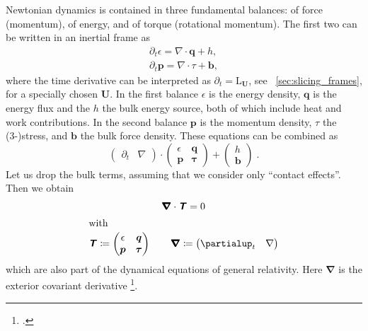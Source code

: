 \documentclass[\ifafour a4paper,12pt,\else a5paper,10pt,\fi%
onecolumn,oneside,article,%
british%
]{memoir}
\theoremstyle{remark}
\theoremstyle{innote}
\newcommand*{\mathte}[1]{\textbf{\textit{\textsf{#1}}}}
\newcommand*{\citep}{\footcites}
\newcommand*{\de}{\partialup}%
\newcommand*{\defd}{\coloneqq}
\renewcommand*{\|}[1][]{\nonscript\,#1\vert\nonscript\;\mathopen{}}
\newcommand*{\sect}{\S}%
\newcommand*{\puzzle}{{\fontencoding{U}\fontfamily{fontawesometwo}\selectfont\symbol{225}}}
\newcommand*{\psect}{{\footnotesize\puzzle}}%
\newcommand*{\Li}{\mathrm{L}}
\newcommand*{\yQ}{h}
\newcommand*{\yqq}{q}
\newcommand*{\yq}{\bm{\yqq}}
\newcommand*{\yTT}{\tau}
\newcommand*{\yT}{\bm{\yTT}}
\newcommand*{\yTTf}{T}
\newcommand*{\yTf}{\mathte{\yTTf}}
\newcommand*{\ybbf}{b}
\newcommand*{\ybf}{\bm{\ybbf}}
\newcommand*{\yFF}{U}
\newcommand*{\yF}{\bm{\yFF}}
\newcommand*{\ypp}{p}
\newcommand*{\yp}{\bm{\ypp}}
\newcommand*{\ye}{\epsilon}
\newcommand*{\ynab}{\nabla}
\newcommand*{\yDi}{\pmb{\bm{\nabla}}}
\begin{document}
Newtonian dynamics is contained in three fundamental balances: of force
(momentum), of energy, and of torque (rotational momentum). The first two
can be written in an inertial frame as
\begin{gather}
  \label{eq:energy_balance_newtonian}
  \de_t \ye = \ynab\cdot\yq + \yQ,
  \\
  \de_t\yp = \ynab\cdot\yTT + \ybf,
\end{gather}
where the time derivative can be interpreted as $\de_t = \Li_{\yF}$, see
\psect~\ref{sec:slicing_frames}, for a specially chosen $\yF$. In the first
balance $\ye$ is the energy density, $\yq$ is the energy flux and the $\yQ$
the bulk energy source, both of which include heat and work contributions.
In the second balance $\yp$ is the momentum density, $\yTT$ the (3-)stress,
and $\ybf$ the bulk force density. These equations can be combined as
\begin{equation}
  \label{eq:energy_balance_newtonian_combo}
  \begin{pmatrix}
    \de_{t} & \ynab
  \end{pmatrix} \cdot
    \begin{pmatrix}
      \ye & \yq \\
      \yp & \yT
    \end{pmatrix}
    +
    \begin{pmatrix}
      \yQ \\ \ybf
    \end{pmatrix}
    \;.
\end{equation}
Let us drop the bulk terms, assuming that we consider only \enquote{contact
  effects}. Then we obtain
\begin{subequations}
  \begin{gather}
    \label{eq:div4stress}
    \yDi\cdot\yTf=0
    \\
    \shortintertext{with}
    \label{eq:def4stress_newton}
    \yTf \defd
    \begin{pmatrix}
      \ye & \yq \\
      \yp & \yT
    \end{pmatrix}
    \qquad
    \yDi \defd   \begin{pmatrix}
    \de_{t} & \ynab
  \end{pmatrix} 
  \end{gather}
\end{subequations}
which are also part of the dynamical equations of general relativity. Here
$\yDi$ is the exterior covariant derivative
\citep[\sect~Vbis.A.4]{choquetbruhatetal1977_r1996}[\sect~14.5]{misneretal1970_r1973}[\sect~9.3]{frankel1997_r2012}[see
also][]{segev2000,segev2000b,segevetal2000,segev2002,segevetal2012,kansoetal2007}.
\end{document}
